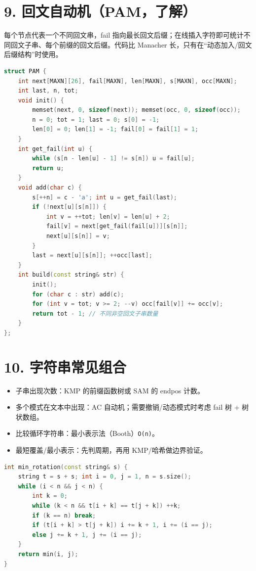\section{9. 回文自动机（PAM，了解）}\label{ux56deux6587ux81eaux52a8ux673apamux4e86ux89e3}

每个节点代表一个不同回文串，fail 指向最长回文后缀；在线插入字符即可统计不同回文子串、每个前缀的回文后缀。代码比 Manacher 长，只有在``动态加入/回文后缀结构''时使用。

\begin{lstlisting}[language={C++}]
struct PAM {
    int next[MAXN][26], fail[MAXN], len[MAXN], s[MAXN], occ[MAXN];
    int last, n, tot;
    void init() {
        memset(next, 0, sizeof(next)); memset(occ, 0, sizeof(occ));
        n = 0; tot = 1; last = 0; s[0] = -1;
        len[0] = 0; len[1] = -1; fail[0] = fail[1] = 1;
    }
    int get_fail(int u) {
        while (s[n - len[u] - 1] != s[n]) u = fail[u];
        return u;
    }
    void add(char c) {
        s[++n] = c - 'a'; int u = get_fail(last);
        if (!next[u][s[n]]) {
            int v = ++tot; len[v] = len[u] + 2;
            fail[v] = next[get_fail(fail[u])][s[n]];
            next[u][s[n]] = v;
        }
        last = next[u][s[n]]; ++occ[last];
    }
    int build(const string& str) {
        init();
        for (char c : str) add(c);
        for (int v = tot; v >= 2; --v) occ[fail[v]] += occ[v];
        return tot - 1; // 不同非空回文子串数量
    }
};
\end{lstlisting}

\section{10. 字符串常见组合}\label{ux5b57ux7b26ux4e32ux5e38ux89c1ux7ec4ux5408}

\begin{itemize}
\tightlist
\item
  子串出现次数：KMP 的前缀函数树或 SAM 的 endpos 计数。
\item
  多个模式在文本中出现：AC 自动机；需要撤销/动态模式时考虑 fail 树 + 树状数组。
\item
  比较循环字符串：最小表示法（Booth）\passthrough{\lstinline!O(n)!}。
\item
  最短覆盖/最小表示：先判周期，再用 KMP/哈希做边界验证。
\end{itemize}

\begin{lstlisting}[language={C++}]
int min_rotation(const string& s) {
    string t = s + s; int i = 0, j = 1, n = s.size();
    while (i < n && j < n) {
        int k = 0;
        while (k < n && t[i + k] == t[j + k]) ++k;
        if (k == n) break;
        if (t[i + k] > t[j + k]) i += k + 1, i += (i == j);
        else j += k + 1, j += (i == j);
    }
    return min(i, j);
}
\end{lstlisting}

